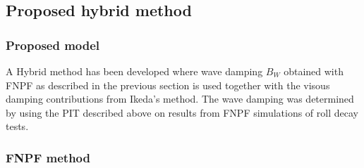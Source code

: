     \subsection{Proposed hybrid method}\label{proposed-hybrid-method}

\subsubsection{Proposed model}\label{proposed-model}

A Hybrid method has been developed where wave damping \(B_W\) obtained
with FNPF as described in the previous section is used together with the
visous damping contributions from Ikeda's method. The wave damping was
determined by using the PIT described above on results from FNPF
simulations of roll decay tests.

\subsubsection{FNPF method}\label{fnpf-method}

    